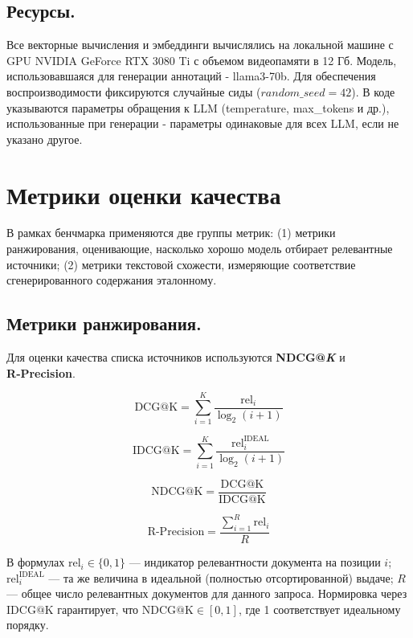 \documentclass{article}
\theoremstyle{definition}
\theoremstyle{plain}
\begin{document}
\subsection*{Ресурсы.}
Все векторные вычисления и эмбеддинги вычислялись на локальной машине с GPU NVIDIA GeForce RTX 3080 Ti с объемом видеопамяти в 12 Гб.
Модель, использовавшаяся для генерации аннотаций - llama3-70b. 
Для обеспечения воспроизводимости фиксируются случайные сиды ($random\_seed = 42$). 
В коде указываются параметры обращения к LLM (temperature, max\_tokens и др.), использованные при генерации - параметры одинаковые для всех LLM, если не указано другое.


\section*{Метрики оценки качества}

В рамках бенчмарка применяются две группы метрик:  
(1) метрики ранжирования, оценивающие, насколько хорошо модель отбирает релевантные источники;  
(2) метрики текстовой схожести, измеряющие соответствие сгенерированного содержания эталонному.

\subsection*{Метрики ранжирования.}

Для оценки качества списка источников используются \textbf{NDCG@\textit{K}} и \textbf{R‑Precision}.

\begin{equation}
\mathrm{DCG@K}= \sum_{i=1}^{K} \frac{\mathrm{rel}_i}{\log_2(i+1)}\tag{3}
\end{equation}

\begin{equation}
\mathrm{IDCG@K}= \sum_{i=1}^{K} \frac{\mathrm{rel}^{\mathrm{IDEAL}}_i}{\log_2(i+1)}\tag{4}
\end{equation}

\begin{equation}
\mathrm{NDCG@K}= \frac{\mathrm{DCG@K}}{\mathrm{IDCG@K}}\tag{5}
\end{equation}

\begin{equation}
\mathrm{R\text{-}Precision}= \frac{\sum_{i=1}^{R} \mathrm{rel}_i}{R}\tag{6}
\end{equation}

В формулах \(\mathrm{rel}_i\in\{0,1\}\) — индикатор релевантности документа на позиции \(i\);  
\(\mathrm{rel}^{\mathrm{IDEAL}}_i\) — та же величина в идеальной (полностью отсортированной) выдаче;  
\(R\) — общее число релевантных документов для данного запроса.  
Нормировка через \(\mathrm{IDCG@K}\) гарантирует, что \(\mathrm{NDCG@K}\in[0,1]\), где 1 соответствует идеальному порядку.
\end{document}
